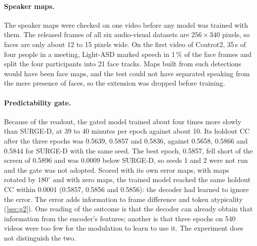 \paragraph{Speaker maps.} The speaker maps were checked on one video before any
model was trained with them. The released frames of all six audio-visual
datasets are $256\times340$ pixels, so faces are only about 12 to 15 pixels
wide. On the first video of Coutrot2, 35\,s of four people in a meeting,
Light-ASD marked speech in 1\,\% of the face frames and split the four
participants into 21 face tracks. Maps built from such detections would have
been face maps, and the test could not have separated speaking from the mere
presence of faces, so the extension was dropped before training.

\paragraph{Predictability gate.} Because of the readout, the gated model
trained about four times more slowly than SURGE-D, at 39 to 40 minutes per
epoch against about 10. Its holdout \acrshort{CC} after the three epochs was
0.5639, 0.5857 and 0.5836, against 0.5658, 0.5866 and 0.5844 for SURGE-D with
the same seed. The best epoch, 0.5857, fell short of the screen of 0.5896 and
was 0.0009 below SURGE-D, so seeds 1 and 2 were not run and the gate was not
adopted. Scored with its own error maps, with maps rotated by $180^{\circ}$ and
with zero maps, the trained model reached the same holdout \acrshort{CC} within
0.0001 (0.5857, 0.5856 and 0.5856): the decoder had learned to ignore the
error. The error adds information to frame difference and token atypicality
(\cref{sec:g2}). One reading of the outcome is that the decoder can already
obtain that information from the encoder's features; another is that three
epochs on 540 videos were too few for the modulation to learn to use it. The
experiment does not distinguish the two.

